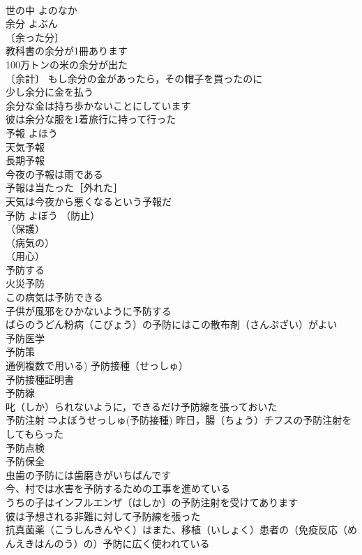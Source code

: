 \documentclass[8pt]{extreport}
\begin{document}
\begin{CJK}{UTF8}{min}
\\	世の中	よのなか	
\\	余分	よぶん	
\\	〔余った分〕
\\	教科書の余分が1冊あります 
\\	100万トンの米の余分が出た 
\\	〔余計〕 もし余分の金があったら，その帽子を買ったのに 
\\	少し余分に金を払う 
\\	余分な金は持ち歩かないことにしています 
\\	彼は余分な服を1着旅行に持って行った 
\\	予報	よほう	
\\	天気予報 
\\	長期予報 
\\	今夜の予報は雨である 
\\	予報は当たった［外れた］ 
\\	天気は今夜から悪くなるという予報だ 
\\	予防	よぼう	（防止）
\\	（保護）
\\	（病気の）
\\	（用心）
\\	予防する 
\\	火災予防 
\\	この病気は予防できる 
\\	子供が風邪をひかないように予防する 
\\	ばらのうどん粉病（こびょう）の予防にはこの散布剤（さんぷざい）がよい 
\\	予防医学 
\\	予防策 
\\	通例複数で用いる) 予防接種（せっしゅ） 
\\	予防接種証明書 
\\	予防線 
\\	叱（しか）られないように，できるだけ予防線を張っておいた 
\\	予防注射 ⇒よぼうせっしゅ(予防接種) 昨日，腸（ちょう）チフスの予防注射をしてもらった 
\\	予防点検 
\\	予防保全 
\\	虫歯の予防には歯磨きがいちばんです 
\\	今、村では水害を予防するための工事を進めている 
\\	うちの子はインフルエンザ〔はしか〕の予防注射を受けてあります 
\\	彼は予想される非難に対して予防線を張った 
\\	抗真菌薬（こうしんきんやく）はまた、移植（いしょく）患者の（免疫反応（めんえきはんのう）の）予防に広く使われている 

\end{CJK}
\end{document}
